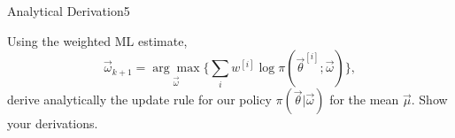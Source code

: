 \begin{questions}


\begin{question}{Analytical Derivation}{5}

Using the weighted ML estimate,
\begin{equation}
    \vec{\omega}_{k+1} = \underset{\vec \omega}{\arg\max} \{ \sum_i w^{[i]} \log \pi(\vec{\theta}^{[i]};\vec{\omega})\},
\end{equation}
derive analytically the update rule for our policy $\pi(\vec{\theta}|\vec{\omega})$ for the mean $\vec{\mu}$. Show your derivations.

\begin{answer}\end{answer}

\end{question}




\end{questions}
